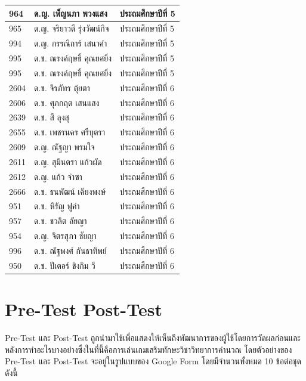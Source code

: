 \begin{center}
\begin{tabular}{ |p{3cm}|p{4cm}|p{3cm}| }
        964 & ด.ญ. เพ็ญนภา พวงแสง & ประถมศึกษาปีที่ 5\\
        \hline
        965 & ด.ญ. จริยาวดี รุ่งวัฒน์กิจ & ประถมศึกษาปีที่ 5\\
        \hline
        994 & ด.ญ. กรรณิการ์ เสนาคำ & ประถมศึกษาปีที่ 5\\
        \hline
        995 & ด.ช. ณรงค์ฤษธิ์ คุณยศยิ่ง & ประถมศึกษาปีที่ 5\\
        \hline
        995 & ด.ช. ณรงค์ฤษธิ์ คุณยศยิ่ง & ประถมศึกษาปีที่ 5\\
        \hline
        2604 & ด.ช. จิรภัทร ตุ้ยตา & ประถมศึกษาปีที่ 6\\
        \hline
        2606 & ด.ช. ศุภกฤต เสนแสง & ประถมศึกษาปีที่ 6\\
        \hline
        2639 & ด.ช. สี ลุงสุ & ประถมศึกษาปีที่ 6\\
        \hline
        2655 & ด.ช. เพชรนคร ศรีบุตรา & ประถมศึกษาปีที่ 6\\
        \hline
        2609 & ด.ญ. ณัฐญา พรมใจ & ประถมศึกษาปีที่ 6\\
        \hline
        2611 & ด.ญ. สุมินตรา แก้วผัด & ประถมศึกษาปีที่ 6\\
        \hline
        2612 & ด.ญ. แก้ว จำซา & ประถมศึกษาปีที่ 6\\
        \hline
        2666 & ด.ช. ธนพัฒน์ เคียงพงษ์ & ประถมศึกษาปีที่ 6\\
        \hline
        951 & ด.ช. หิรัญ ฟูคำ & ประถมศึกษาปีที่ 6\\
        \hline
        957 & ด.ช. ชวลิต ลัยญา & ประถมศึกษาปีที่ 6\\
        \hline
        954 & ด.ญ. จิตรสุภา ชัยญา & ประถมศึกษาปีที่ 6\\
        \hline
        996 & ด.ช. ณัฐพงศ์ กันธาทิพย์ & ประถมศึกษาปีที่ 6\\
        \hline
        950 & ด.ช. ปีเตอร์ ชิงกิม วี & ประถมศึกษาปีที่ 6\\
        \hline
    \end{tabular}
\end{center}

\chapter{Pre-Test Post-Test}
Pre-Test และ Post-Test ถูกนำมาใช้เพื่อแสดงให้เห็นถึงพัฒนาการของผู้ใช้โดยการวัดผลก่อนและหลังการทำอะไรบางอย่างซึ่งในที่นี้คือการเล่นเกมเสริมทักษะวิชาวิทยาการคำนวณ
โดยตัวอย่างของ Pre-Test และ Post-Test จะอยู่ในรูปแบบของ Google Form โดยมีจำนวนทั้งหมด 10 ข้อต่อชุดดังนี้
